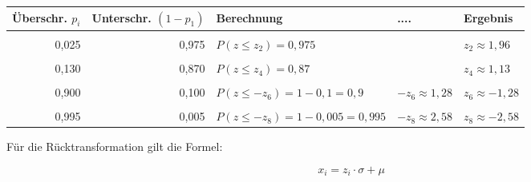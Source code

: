 \documentclass[
  11pt,
  ngerman,
  a4paper,
]{report}
\begin{document}
\begin{table}[H]
\centering
\begin{tabular}{rr>{\raggedright\arraybackslash}p{8cm}>{\raggedright\arraybackslash}p{8cm}>{\raggedright\arraybackslash}p{8cm}}
\toprule
\textbf{Überschr. $p_{i}$} & \textbf{Unterschr. $(1-p_{1})$} & \textbf{Berechnung} & \textbf{....} & \textbf{Ergebnis}\\
\midrule
\cellcolor{gray!6}{0,015} & \cellcolor{gray!6}{0,985} & \cellcolor{gray!6}{$P(z \leq z_{1}) = 0{,}985$} & \cellcolor{gray!6}{} & \cellcolor{gray!6}{$z_{1} \approx 2{,}17$}\\
0,025 & 0,975 & $P(z \leq z_{2}) = 0{,}975$ &  & $z_{2} \approx 1{,}96$\\
\cellcolor{gray!6}{0,050} & \cellcolor{gray!6}{0,950} & \cellcolor{gray!6}{$P(z \leq z_{3}) = 0{,}95$} & \cellcolor{gray!6}{} & \cellcolor{gray!6}{$z_{3} \approx 1{,}64$}\\
0,130 & 0,870 & $P(z \leq z_{4}) = 0{,}87$ &  & $z_{4} \approx 1{,}13$\\
\cellcolor{gray!6}{0,500} & \cellcolor{gray!6}{0,500} & \cellcolor{gray!6}{$P(z \leq z_{5}) = 0{,}5$} & \cellcolor{gray!6}{} & \cellcolor{gray!6}{$z_{5} \approx 0$}\\
0,900 & 0,100 & $P(z \leq -z_{6}) = 1-0{,}1 = 0{,}9$ & $-z_{6} \approx 1{,}28$ & $z_{6} \approx -1{,}28$\\
\cellcolor{gray!6}{0,990} & \cellcolor{gray!6}{0,010} & \cellcolor{gray!6}{$P(z \leq -z_{7}) = 1-0{,}01 = 0{,}99$} & \cellcolor{gray!6}{$-z_{7} \approx 2{,}33$} & \cellcolor{gray!6}{$z_{7} \approx -2{,}33$}\\
0,995 & 0,005 & $P(z \leq -z_{8}) = 1-0{,}005 = 0{,}995$ & $-z_{8} \approx 2{,}58$ & $z_{8} \approx -2{,}58$\\
\bottomrule
\end{tabular}
\end{table}

Für die Rücktransformation gilt die Formel:

\[x_{i} = z_{i} \cdot \sigma + \mu\]
\end{document}
